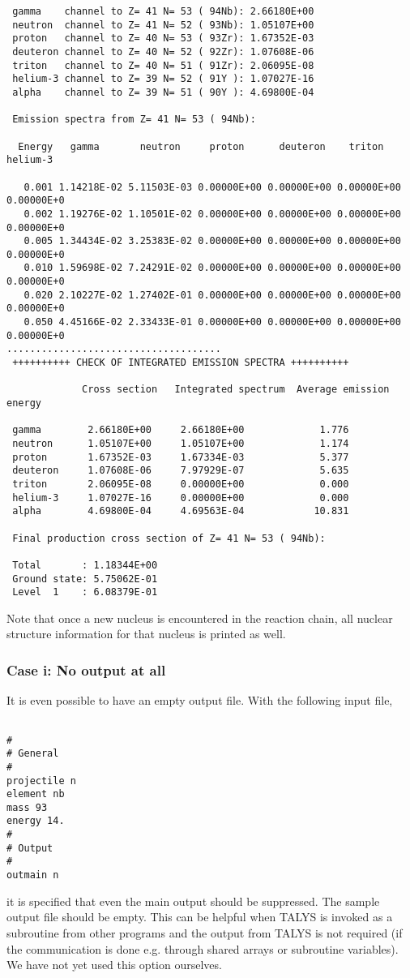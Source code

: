 \begin{samplecase}
{\begin{verbatim}
 gamma    channel to Z= 41 N= 53 ( 94Nb): 2.66180E+00
 neutron  channel to Z= 41 N= 52 ( 93Nb): 1.05107E+00
 proton   channel to Z= 40 N= 53 ( 93Zr): 1.67352E-03
 deuteron channel to Z= 40 N= 52 ( 92Zr): 1.07608E-06
 triton   channel to Z= 40 N= 51 ( 91Zr): 2.06095E-08
 helium-3 channel to Z= 39 N= 52 ( 91Y ): 1.07027E-16
 alpha    channel to Z= 39 N= 51 ( 90Y ): 4.69800E-04
   
 Emission spectra from Z= 41 N= 53 ( 94Nb):
   
  Energy   gamma       neutron     proton      deuteron    triton      helium-3 

   0.001 1.14218E-02 5.11503E-03 0.00000E+00 0.00000E+00 0.00000E+00 0.00000E+0
   0.002 1.19276E-02 1.10501E-02 0.00000E+00 0.00000E+00 0.00000E+00 0.00000E+0
   0.005 1.34434E-02 3.25383E-02 0.00000E+00 0.00000E+00 0.00000E+00 0.00000E+0
   0.010 1.59698E-02 7.24291E-02 0.00000E+00 0.00000E+00 0.00000E+00 0.00000E+0
   0.020 2.10227E-02 1.27402E-01 0.00000E+00 0.00000E+00 0.00000E+00 0.00000E+0
   0.050 4.45166E-02 2.33433E-01 0.00000E+00 0.00000E+00 0.00000E+00 0.00000E+0
.....................................
 ++++++++++ CHECK OF INTEGRATED EMISSION SPECTRA ++++++++++
   
             Cross section   Integrated spectrum  Average emission energy
 
 gamma        2.66180E+00     2.66180E+00             1.776
 neutron      1.05107E+00     1.05107E+00             1.174
 proton       1.67352E-03     1.67334E-03             5.377
 deuteron     1.07608E-06     7.97929E-07             5.635
 triton       2.06095E-08     0.00000E+00             0.000
 helium-3     1.07027E-16     0.00000E+00             0.000
 alpha        4.69800E-04     4.69563E-04            10.831
   
 Final production cross section of Z= 41 N= 53 ( 94Nb):    
  
 Total       : 1.18344E+00
 Ground state: 5.75062E-01
 Level  1    : 6.08379E-01
\end{verbatim} } \renewcommand{\baselinestretch}{1.07}\small\normalsize
\noindent
Note that once a new nucleus is encountered in the reaction chain, all nuclear 
structure information for that nucleus is printed as well.
\subsubsection{Case i: No output at all}
It is even possible to have an empty output file. With the following input file,

{\small \begin{verbatim}

#
# General
#
projectile n
element nb
mass 93
energy 14.
#
# Output
#
outmain n
\end{verbatim} } \renewcommand{\baselinestretch}{1.07}\small\normalsize
\noindent
it is specified that even the main output should be suppressed. 
The sample output file should be empty. This can be helpful 
when TALYS is invoked as a subroutine from other programs and the output from 
TALYS is not required (if the communication is done e.g. through 
shared arrays or subroutine variables). We have not yet used this option
ourselves.
\end{samplecase}
